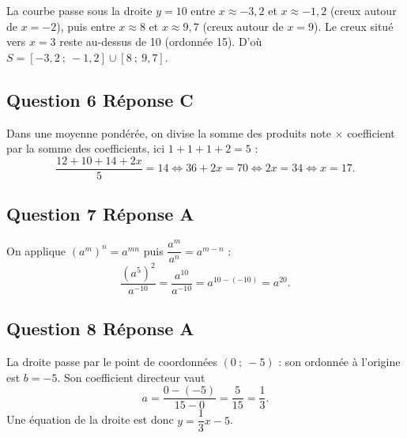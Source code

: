 \documentclass[10pt]{article}
\begin{document}
La courbe passe sous la droite $y = 10$ entre $x \approx -3,2$ et $x \approx -1,2$
(creux autour de $x = -2$), puis entre $x \approx 8$ et $x \approx 9,7$ (creux autour de
$x = 9$). Le creux situé vers $x = 3$ reste au-dessus de 10 (ordonnée 15).
D'où $S = [-3,2~;~-1,2] \cup [8~;~9,7]$.



\subsection*{Question 6 \quad Réponse C}

Dans une moyenne pondérée, on divise la somme des produits note $\times$ coefficient par la
somme des coefficients, ici $1 + 1 + 1 + 2 = 5$ :
\[\dfrac{12 + 10 + 14 + 2x}{5} = 14 \iff 36 + 2x = 70 \iff 2x = 34 \iff x = 17.\]

\subsection*{Question 7 \quad Réponse A}

On applique $\left(a^m\right)^n = a^{mn}$ puis $\dfrac{a^m}{a^n} = a^{m-n}$ :
\[\dfrac{\left(a^5\right)^2}{a^{-10}} = \dfrac{a^{10}}{a^{-10}} = a^{10-(-10)} = a^{20}.\]


\subsection*{Question 8 \quad Réponse A}

La droite passe par le point de coordonnées $(0~;~-5)$ : son ordonnée à l'origine est $b = -5$. Son coefficient
directeur vaut
\[a = \dfrac{0 - (-5)}{15 - 0} = \dfrac{5}{15} = \dfrac{1}{3}.\]
Une équation de la droite est donc $y = \dfrac{1}{3}x - 5$.
\end{document}
